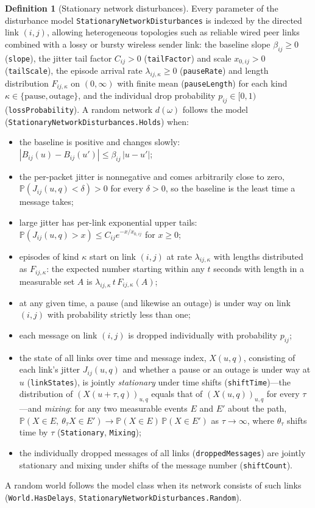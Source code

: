 \documentclass[11pt,a4paper]{article}
\newcommand{\lean}[1]{\texttt{#1}}
\newcommand{\Prob}{\mathbb{P}}
\theoremstyle{definition}
\newtheorem{definition}{Definition}[section]
\begin{document}
\begin{definition}[Stationary network disturbances]
Every parameter of the disturbance model
\lean{StationaryNetworkDisturbances} is indexed by the directed link $(i, j)$,
allowing heterogeneous topologies such as reliable wired peer links combined
with a lossy or bursty wireless sender link: the baseline slope $\beta_{ij} \ge 0$ (\lean{slope}), the jitter tail factor
$C_{ij} > 0$ (\lean{tailFactor}) and scale $x_{0,ij} > 0$ (\lean{tailScale}),
the episode arrival rate $\lambda_{ij,\kappa} \ge 0$ (\lean{pauseRate}) and
length distribution $F_{ij,\kappa}$ on $(0, \infty)$ with finite mean
(\lean{pauseLength}) for each kind $\kappa \in \{\text{pause}, \text{outage}\}$,
and the individual drop probability $p_{ij} \in [0, 1)$
(\lean{lossProbability}). A random network $d(\omega)$ follows the model
(\lean{StationaryNetworkDisturbances.\allowbreak Holds}) when:
\begin{itemize}
\item the baseline is positive and changes slowly:
  $|B_{ij}(u) - B_{ij}(u')| \le \beta_{ij}\,|u - u'|$;
\item the per-packet jitter is nonnegative and comes arbitrarily close to
  zero, $\Prob(J_{ij}(u, q) < \delta) > 0$ for every $\delta > 0$, so the
  baseline is the least time a message takes;
\item large jitter has per-link exponential upper tails:
  $\Prob(J_{ij}(u, q) > x) \le C_{ij} e^{-x / x_{0,ij}}$ for $x \ge 0$;
\item episodes of kind $\kappa$ start on link $(i, j)$ at rate
  $\lambda_{ij,\kappa}$ with lengths distributed as $F_{ij,\kappa}$: the
  expected number starting within any $t$ seconds with length in a
  measurable set $A$ is $\lambda_{ij,\kappa}\, t\, F_{ij,\kappa}(A)$;
\item at any given time, a pause (and likewise an outage) is under way on
  link $(i, j)$ with probability strictly less than one;
\item each message on link $(i, j)$ is dropped individually with probability
  $p_{ij}$;
\item the state of all links over time and message index, $X(u, q)$,
  consisting of each link's jitter $J_{ij}(u, q)$ and whether a pause or an
  outage is under way at $u$ (\lean{linkStates}), is jointly
  \emph{stationary} under time shifts (\lean{shiftTime})---the distribution
  of $(X(u + \tau, q))_{u,q}$ equals that of $(X(u, q))_{u,q}$ for every
  $\tau$---and \emph{mixing}: for any two measurable events $E$ and $E'$
  about the path,
  $\Prob(X \in E,\ \theta_\tau X \in E') \to \Prob(X \in E)\,\Prob(X \in
  E')$ as $\tau \to \infty$, where $\theta_\tau$ shifts time by $\tau$
  (\lean{Stationary}, \lean{Mixing});
\item the individually dropped messages of all links (\lean{droppedMessages})
  are jointly stationary and mixing under shifts of the message number
  (\lean{shiftCount}).
\end{itemize}
A random world follows the model class when its network consists of such
links (\lean{World.HasDelays},
\lean{StationaryNetworkDisturbances.\allowbreak Random}).
\end{definition}
\end{document}
